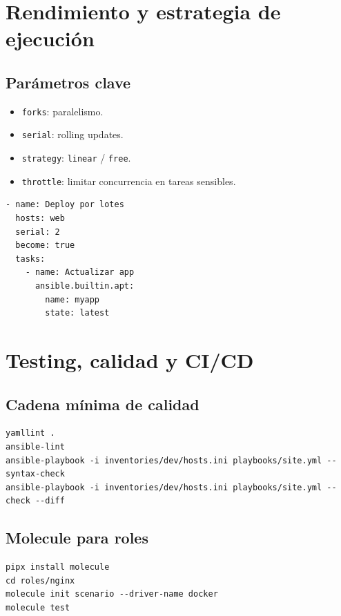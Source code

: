 \documentclass[12pt,a4paper]{article}
\begin{document}
\section{Rendimiento y estrategia de ejecución}

\subsection{Parámetros clave}
\begin{itemize}
  \item \texttt{forks}: paralelismo.
  \item \texttt{serial}: rolling updates.
  \item \texttt{strategy}: \texttt{linear} / \texttt{free}.
  \item \texttt{throttle}: limitar concurrencia en tareas sensibles.
\end{itemize}

\begin{lstlisting}[caption=Rolling update seguro]
- name: Deploy por lotes
  hosts: web
  serial: 2
  become: true
  tasks:
    - name: Actualizar app
      ansible.builtin.apt:
        name: myapp
        state: latest
\end{lstlisting}

\section{Testing, calidad y CI/CD}

\subsection{Cadena mínima de calidad}
\begin{lstlisting}[caption=Pipeline recomendada]
yamllint .
ansible-lint
ansible-playbook -i inventories/dev/hosts.ini playbooks/site.yml --syntax-check
ansible-playbook -i inventories/dev/hosts.ini playbooks/site.yml --check --diff
\end{lstlisting}

\subsection{Molecule para roles}
\begin{lstlisting}[caption=Test de role con Molecule]
pipx install molecule
cd roles/nginx
molecule init scenario --driver-name docker
molecule test
\end{lstlisting}
\end{document}
